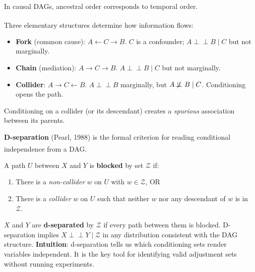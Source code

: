 \begin{tcbitemize}[ skin=sectionraster ]
    In causal DAGs, ancestral order corresponds to temporal order.

    \tcbitem[title={Fork, Chain, and Collider}, raster multicolumn=3]
    Three elementary structures determine how information
    flows:\textsuperscript{\cite[][pp.~43--45]{barberBayesianReasoningMachine2012}}

    \begin{itemize}
        \item \textbf{Fork} (common cause): $A \leftarrow C \rightarrow B$.
              $C$ is a confounder; $A \perp\!\!\!\perp B \mid C$ but not marginally.
        \item \textbf{Chain} (mediation): $A \rightarrow C \rightarrow B$.
              $A \perp\!\!\!\perp B \mid C$ but not marginally.
        \item \textbf{Collider}: $A \rightarrow C \leftarrow B$.
              $A \perp\!\!\!\perp B$ marginally, but $A \not\!\perp\!\!\!\perp B \mid C$.
              Conditioning opens the path.
    \end{itemize}

    Conditioning on a collider (or its descendant) creates a \emph{spurious}
    association between its parents.

    \tcbitem[title=D-Separation, raster multicolumn=6]
    \textbf{D-separation} (Pearl, 1988) is the formal criterion for reading
    conditional independence from a
    DAG.\textsuperscript{\cite[][pp.~45--46]{barberBayesianReasoningMachine2012}}

    A path $U$ between $X$ and $Y$ is \textbf{blocked} by set $\mathcal{Z}$ if:
    \begin{enumerate}
        \item There is a \emph{non-collider} $w$ on $U$ with $w \in \mathcal{Z}$, OR
        \item There is a \emph{collider} $w$ on $U$ such that neither $w$ nor
              any descendant of $w$ is in $\mathcal{Z}$.
    \end{enumerate}

    $X$ and $Y$ are \textbf{d-separated} by $\mathcal{Z}$ if every path between
    them is blocked. D-separation implies $X \perp\!\!\!\perp Y \mid \mathcal{Z}$
    in any distribution consistent with the DAG structure.
    \tcblower
    \textbf{Intuition}: d-separation tells us which conditioning sets render
    variables independent. It is the key tool for identifying valid adjustment
    sets without running experiments.

    \end{tcbitemize}

